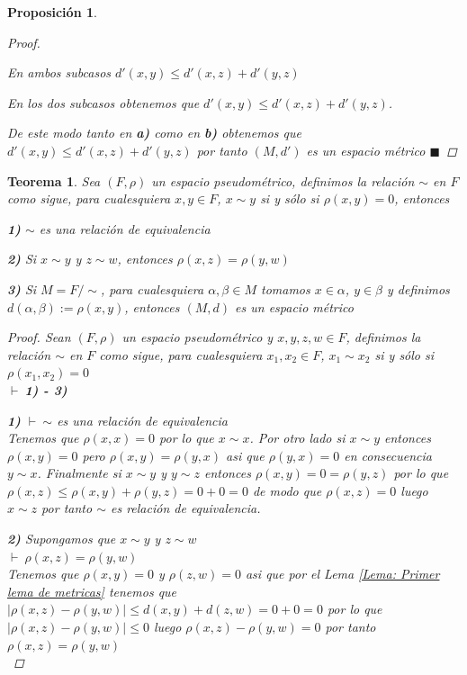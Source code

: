 \documentclass[oneside]{book} %
\theoremstyle{Teorema}
\newtheorem{Teorema}[Definicion]{Teorema}
\newtheorem{Proposicion}[Definicion]{Proposición}
\theoremstyle{Ejemplos}
\theoremstyle{[Obs]}
\newcommand{\abs}[1]{\left|#1\right|} %
\renewcommand{\{}{\left\lbrace} %
\renewcommand{\}}{\right\rbrace} %
\renewcommand{\qed}{$\blacksquare$} %
\newcommand{\pd}{$\vdash\ $} %
\begin{document}
\begin{Proposicion}
\begin{proof}
{{						}

						En ambos subcasos $d'(x, y) \leq d'(x, z) + d'(y, z)$

					}

					En los dos subcasos obtenemos que $d'(x, y) \leq d'(x, z) + d'(y, z)$.

					De este modo tanto en \textbf{a)} como en \textbf{b)} obtenemos que $d'(x, y) \leq d'(x, z) + d'(y, z)$ por tanto $(M, d')$ es un espacio métrico \qed

				\end{proof}

			\end{Proposicion}

			\begin{Teorema}\setlength{\parindent}{0em}
				
				Sea $(F, \rho)$ un espacio pseudométrico, definimos la relación $\sim$  en $F$ como sigue, para cualesquiera $x, y \in F$, $x \sim y$ si y sólo si $\rho(x, y) = 0$, entonces 
				
				\textbf{1)} $\sim$ es una relación de equivalencia 
				
				\textbf{2)} Si $x \sim y$ y $z \sim w$, entonces $\rho(x, z) = \rho(y, w)$ 

				\textbf{3)} Si $M = F/\sim$, para cualesquiera $\alpha, \beta \in M$ tomamos $x \in \alpha$, $y \in \beta$ y definimos $d(\alpha, \beta) := \rho(x, y)$, entonces $(M, d)$ es un espacio métrico 

				\begin{proof}
					
					Sean $(F, \rho)$ un espacio pseudométrico y $x, y, z, w \in F$, definimos la relación $\sim$  en $F$ como sigue, para cualesquiera $x_1, x_2 \in F$, $x_1 \sim x_2$ si y sólo si $\rho(x_1, x_2) = 0$ \\
					\pd \textbf{1) - 3)}

					\textbf{1)} \pd $\sim$ es una relación de equivalencia \\
					Tenemos que $\rho(x, x) = 0$ por lo que $x \sim x$. Por otro lado si $x \sim y$ entonces $\rho(x, y) = 0$ pero $\rho(x, y) = \rho(y, x)$ asi que $\rho(y, x) = 0$ en consecuencia $y \sim x$. Finalmente si $x \sim y$ y $y \sim z$ entonces $\rho(x, y) = 0 = \rho(y, z)$ por lo que $\rho(x, z) \leq \rho(x, y) + \rho(y, z) = 0 + 0 = 0$ de modo que $\rho(x, z) = 0$ luego $x \sim z$ por tanto $\sim$ es relación de equivalencia.
					
					\textbf{2)} Supongamos que $x \sim y$ y $z \sim w$ \\
					\pd $\rho(x, z) = \rho(y, w)$ \\
					Tenemos que $\rho(x, y) = 0$ y $\rho(z, w) = 0$ asi que por el Lema \ref{Lema: Primer lema de metricas} tenemos que $\abs{\rho(x, z) - \rho(y, w)} \leq d(x, y) + d(z, w) = 0 + 0 = 0$ por lo que $\abs{\rho(x, z) - \rho(y, w)} \leq 0$ luego $\rho(x, z) - \rho(y, w) = 0$ por tanto $\rho(x, z) = \rho(y, w)$ \\


\end{proof}
\end{Teorema}
\end{document}
